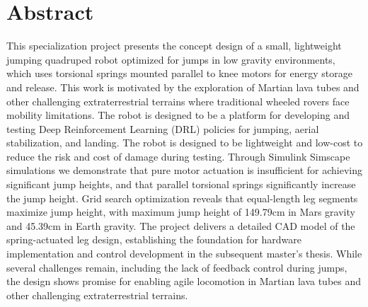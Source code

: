 
\section*{Abstract}

This specialization project presents the concept design of a small, lightweight jumping quadruped robot optimized for jumps in low gravity environments, which uses torsional springs mounted parallel to knee motors for energy storage and release. This work is motivated by the exploration of Martian lava tubes and other challenging extraterrestrial terrains where traditional wheeled rovers face mobility limitations. The robot is designed to be a platform for developing and testing Deep Reinforcement Learning (DRL) policies for jumping, aerial stabilization, and landing. The robot is designed to be lightweight and low-cost to reduce the risk and cost of damage during testing. Through Simulink Simscape simulations we demonstrate that pure motor actuation is insufficient for achieving significant jump heights, and that parallel torsional springs significantly increase the jump height. Grid search optimization reveals that equal-length leg segments maximize jump height, with maximum jump height of 149.79cm in Mars gravity and 45.39cm in Earth gravity. The project delivers a detailed CAD model of the spring-actuated leg design, establishing the foundation for hardware implementation and control development in the subsequent master's thesis. While several challenges remain, including the lack of feedback control during jumps, the design shows promise for enabling agile locomotion in Martian lava tubes and other challenging extraterrestrial terrains.



